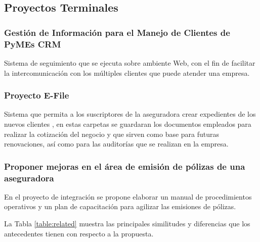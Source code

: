 \subsection*{Proyectos Terminales}

\subsubsection*{Gestión de Información para el Manejo de Clientes de PyMEs CRM \cite{pro:crm}}

Sistema  de  seguimiento  que  se  
ejecuta sobre ambiente Web, con el fin de facilitar la intercomunicación con los múltiples clientes 
que puede atender una empresa.

\subsubsection*{Proyecto E-File \cite{pro:zurich}}

Sistema  que  permita  a  los  suscriptores  de  la 
aseguradora  crear expedientes de los nuevos clientes   , en 
estas   carpetas   se   guardaran   los   documentos   empleados   para   
realizar  la  cotización  del  negocio  y  que  sirven  como  base  para  
futuras 
renovaciones, 
así como para las auditorías que se realizan 
en la empresa. 

\subsubsection*{Proponer mejoras en el área de emisión de pólizas de una aseguradora \cite{pro:emi}}

En  el  proyecto  de  integración  se  propone  elaborar un manual de procedimientos operativos y un plan de capacitación para agilizar las emisiones de pólizas.

La Tabla \ref{table:related} muestra las principales similitudes y diferencias que los antecedentes tienen con respecto a la propuesta.

